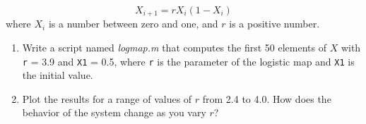 
\begin{equation*}
X_{i+1} = r X_i (1-X_i)
\end{equation*}
where $X_i$ is a number between zero and one, and $r$ is a positive number.

\begin{enumerate}

\item Write a script named \emph{logmap.m} that computes the first 50
elements of $X$ with \lstinline{r} = 3.9 and \lstinline{X1} = 0.5, where
\lstinline{r} is the parameter of the logistic map and \lstinline{X1} is the
initial value.

\item Plot the results for a range of values of $r$ from 2.4 to 4.0.
How does the behavior of the system change as you vary $r$?

\end{enumerate}




